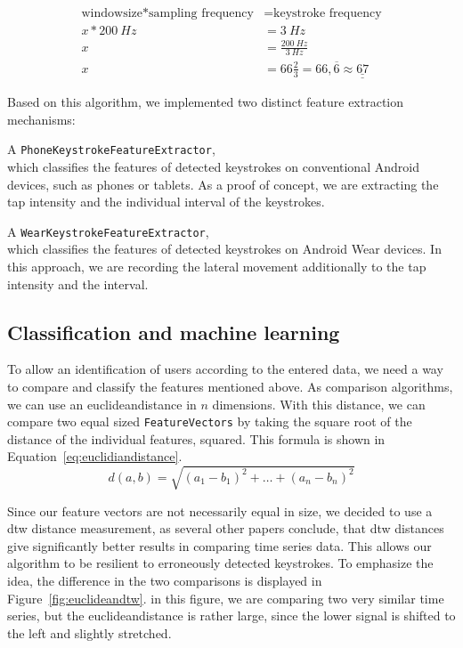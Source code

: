 \begin{equation}\label{eq:windowsize}\begin{split}
\textrm{windowsize} * \textrm{sampling frequency} & = \textrm{keystroke frequency}\\
x * \SI{200}{Hz} & = \SI{3}{Hz}\\
x & = \frac{\SI{200}{Hz}}{\SI{3}{Hz}}\\
x & = 66 \frac{2}{3} = 66,\overline{6} \approx \underline{\underline{67}}
\end{split}\end{equation}

Based on this algorithm, we implemented two distinct feature extraction mechanisms:

A \lstinline$PhoneKeystrokeFeatureExtractor$,\\
which classifies the features of detected keystrokes on conventional Android devices, such as phones or tablets. As a proof of concept, we are extracting the tap intensity and the individual interval of the keystrokes.
    
A \lstinline$WearKeystrokeFeatureExtractor$,\\
which classifies the features of detected keystrokes on Android Wear devices. In this approach, we are recording the lateral movement additionally to the tap intensity and the interval.

\subsection{Classification and machine learning}
To allow an identification of users according to the entered data, we need a way to compare and classify the features mentioned above. 
As comparison algorithms, we can use an \gls{euclideandistance} in $n$ dimensions. With this distance, we can compare two equal sized \lstinline$FeatureVectors$ by taking the square root of the distance of the individual features, squared. This formula is shown in Equation~\ref{eq:euclidiandistance}.
\begin{equation}\label{eq:euclidiandistance}
d(a, b) = \sqrt{(a_1 - b_1)^2 + \ldots + (a_n - b_n)^2}
\end{equation}

Since our feature vectors are not necessarily equal in size, we decided to use a \gls{dtw} distance measurement, as several other papers conclude, that \gls{dtw} distances give significantly better results in comparing time series data\cite{ding2008querying}. This allows our algorithm to be resilient to erroneously detected keystrokes. To emphasize the idea, the difference in the two comparisons is displayed in Figure~\ref{fig:euclideandtw}. in this figure, we are comparing two very similar time series, but the \gls{euclideandistance} is rather large, since the lower signal is shifted to the left and slightly stretched.

